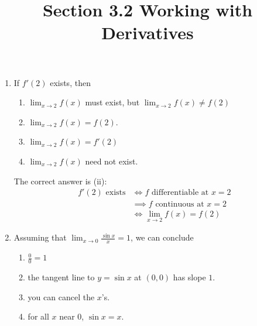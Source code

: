 \documentclass[nooutcomes]{ximera}
\title{Section 3.2 Working with Derivatives}
\begin{document}
\begin{abstract}		\end{abstract}
\maketitle

\begin{problem}
	
	\begin{enumerate}

    \item
   
      If $f'(2)$ exists, then
      \begin{enumerate}
        \item
          $\lim_{x \to 2} f(x)$ must exist, but $\lim_{x \to 2} f(x) \ne f(2)$

        \item
          $\lim_{x \to 2} f(x) = f(2)$.

        \item
          $\lim_{x \to 2} f(x) = f'(2)$

        \item
          $\lim_{x \to 2} f(x)$ need not exist.
      \end{enumerate}
      \begin{freeResponse}
        The correct answer is (ii):
        \begin{align*}
          \mbox{$f'(2)$ exists} &\iff \mbox{$f$ differentiable at $x = 2$}\\
                                &\implies \mbox{$f$ continuous at $x = 2$}\\
                                &\iff \lim_{x \to 2} f(x) = f(2)
        \end{align*}
      \end{freeResponse}


    \item

      Assuming that $\lim_{x \to 0} \frac{\sin x}{x} = 1$, we can conclude
      \begin{enumerate}
        \item
          $\frac{0}{0} = 1$
        \item
          the tangent line to $y = \sin x$ at $(0,0)$ has slope $1$.

        \item
          you can cancel the $x$'s.

        \item
          for all $x$ near $0$, $\sin x = x$.


\end{enumerate}
\end{enumerate}
\end{problem}
\end{document}
